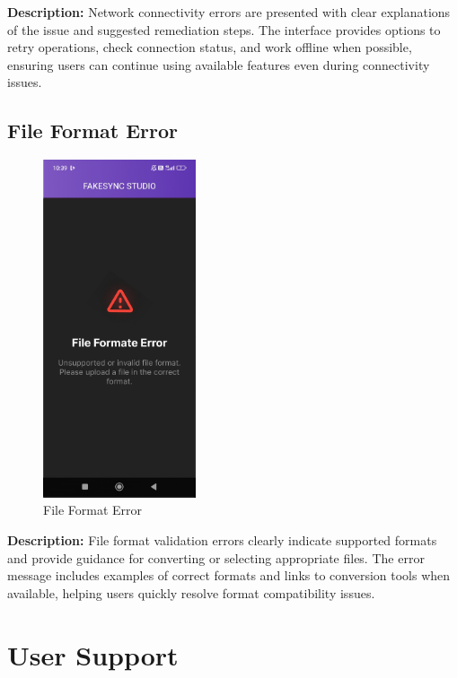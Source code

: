 \documentclass[12pt,a4paper]{report}
\begin{document}
\textbf{Description:} Network connectivity errors are presented with clear explanations of the issue and suggested remediation steps. The interface provides options to retry operations, check connection status, and work offline when possible, ensuring users can continue using available features even during connectivity issues.

\subsection{File Format Error}

\begin{figure}[H]
\centering
\includegraphics[width=0.4\textwidth]{figures/file_format_error.png}
\caption{File Format Error}
\label{fig:file_format_error}
\end{figure}

\textbf{Description:} File format validation errors clearly indicate supported formats and provide guidance for converting or selecting appropriate files. The error message includes examples of correct formats and links to conversion tools when available, helping users quickly resolve format compatibility issues.

\section{User Support}
\end{document}
